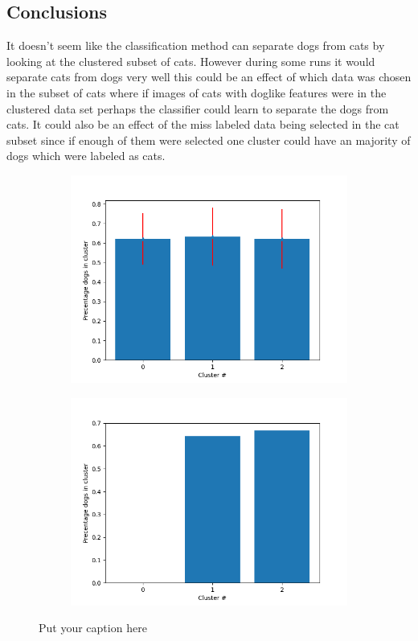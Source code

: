\documentclass{article}
\begin{document}
\subsection{Conclusions}
It doesn't seem like the classification method can separate dogs from cats by looking at the clustered subset of cats. However during some runs it would separate cats from dogs very well this could be an effect of which data was chosen in the subset of cats where if images of cats with doglike features were in the clustered data set perhaps the classifier could learn to separate the dogs from cats. It could also be an effect of the miss labeled data being selected in the cat subset since if enough of them were selected one cluster could have an majority of dogs which were labeled as cats.  
\begin{figure}[H]
\begin{subfigure}{.5\textwidth}
  \centering
  \includegraphics[width=1\linewidth]{1f/clustering avg.png}  
  \label{1fa}
\end{subfigure}
\begin{subfigure}{.5\textwidth}
  \centering
  \includegraphics[width=1\linewidth]{1f/clustering.png}  
  \label{1f b}
\end{subfigure}
\caption{Put your caption here}
\label{1f}
\end{figure}
\end{document}
